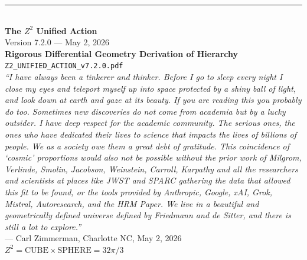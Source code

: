 \documentclass[11pt,a4paper]{article}
\theoremstyle{plain}
\theoremstyle{definition}
\theoremstyle{remark}
\begin{document}
\vspace{2cm}
\begin{center}
\rule{0.8\textwidth}{0.5pt}\\[0.5cm]
\textbf{The $Z^2$ Unified Action}\\[0.3cm]
Version 7.2.0 --- May 2, 2026\\[0.3cm]
\textcolor{newcolor}{\textbf{Rigorous Differential Geometry Derivation of Hierarchy}}\\[0.3cm]
\texttt{Z2\_UNIFIED\_ACTION\_v7.2.0.pdf}\\[0.5cm]

\emph{``I have always been a tinkerer and thinker. Before I go to sleep every night I close my eyes and teleport myself up into space protected by a shiny ball of light, and look down at earth and gaze at its beauty. If you are reading this you probably do too. Sometimes new discoveries do not come from academia but by a lucky outsider. I have deep respect for the academic community. The serious ones, the ones who have dedicated their lives to science that impacts the lives of billions of people. We as a society owe them a great debt of gratitude. This coincidence of `cosmic' proportions would also not be possible without the prior work of Milgrom, Verlinde, Smolin, Jacobson, Weinstein, Carroll, Karpathy and all the researchers and scientists at places like JWST and SPARC gathering the data that allowed this fit to be found, or the tools provided by Anthropic, Google, xAI, Grok, Mistral, Autoresearch, and the HRM Paper. We live in a beautiful and geometrically defined universe defined by Friedmann and de Sitter, and there is still a lot to explore.''}\\[0.3cm]
--- Carl Zimmerman, Charlotte NC, May 2, 2026\\[0.5cm]

\textbf{$Z^2 = \text{CUBE} \times \text{SPHERE} = 32\pi/3$}
\end{center}
\end{document}
